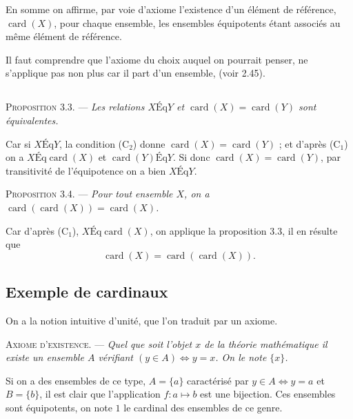 En somme on affirme, par voie d'axiome l'existence d'un élément de référence, $\operatorname{card}(X)$, pour chaque ensemble, les ensembles équipotents étant associés au même élément de référence.

Il faut comprendre que l'axiome du choix auquel on pourrait penser, ne s'applique pas non plus car il part d'un ensemble, (voir 2.45).

\subsection*{}

\medskip\noindent\textsc{Proposition 3.3.} --- \emph{Les relations $X\mathrel{\mathrm{Éq}}Y$ et $\operatorname{card}(X)=\operatorname{card}(Y)$ sont équivalentes.}

Car si $X\mathrel{\mathrm{Éq}}Y$, la condition (C$_2$) donne $\operatorname{card}(X)=\operatorname{card}(Y)$ ; et d'après (C$_1$) on a $X\mathrel{\mathrm{Éq}}\operatorname{card}(X)$ et $\operatorname{card}(Y)\mathrel{\mathrm{Éq}}Y$. Si donc $\operatorname{card}(X)=\operatorname{card}(Y)$, par transitivité de l'équipotence on a bien $X\mathrel{\mathrm{Éq}}Y$. \bookend

\medskip\noindent\textsc{Proposition 3.4.} --- \emph{Pour tout ensemble $X$, on a $\operatorname{card}(\operatorname{card}(X))=\operatorname{card}(X)$.}

Car d'après (C$_1$), $X\mathrel{\mathrm{Éq}}\operatorname{card}(X)$, on applique la proposition 3.3, il en résulte que
\[
\operatorname{card}(X)=\operatorname{card}(\operatorname{card}(X)).
\]
\bookend

\subsection*{Exemple de cardinaux}

On a la notion intuitive d'unité, que l'on traduit par un axiome.

\medskip\noindent\textsc{Axiome d'existence.} --- \emph{Quel que soit l'objet $x$ de la théorie mathématique il existe un ensemble $A$ vérifiant $(y\in A)\Leftrightarrow y=x$. On le note $\{x\}$.}

Si on a des ensembles de ce type, $A=\{a\}$ caractérisé par $y\in A\Leftrightarrow y=a$ et $B=\{b\}$, il est clair que l'application $f:a\mapsto b$ est une bijection. Ces ensembles sont équipotents, on note $1$ le cardinal des ensembles de ce genre.

